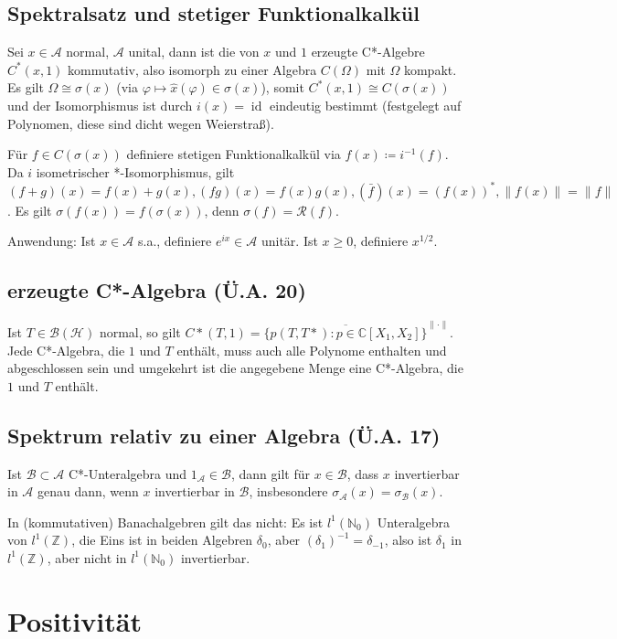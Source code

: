 \documentclass[11pt,a4paper]{scrartcl}
\newcommand{\N}{\mathbb{N}} %
\newcommand{\Z}{\mathbb{Z}} %
\newcommand{\C}{\mathbb{C}} %
\newcommand{\Hc}{\mathcal{H}}
\newcommand{\A}{\mathcal{A}}
\newcommand{\B}{\mathcal{B}}
\newcommand{\Rc}{\mathcal{R}}
\theoremstyle{plain}
\theoremstyle{definition}
\theoremstyle{remark}
\DeclareMathOperator{\id}{id}
\begin{document}
\subsection{Spektralsatz und stetiger Funktionalkalkül}

Sei $x\in \A$ normal, $\A$ unital, dann ist die von $x$ und $1$ erzeugte C*-Algebre $C^*(x,1)$ kommutativ, also isomorph zu einer Algebra $C(\Omega)$ mit $\Omega$ kompakt. Es gilt $\Omega \cong \sigma(x)$ (via $\varphi \mapsto \hat x(\varphi) \in \sigma(x)$), somit $C^*(x,1)\cong C(\sigma(x))$ und der Isomorphismus ist durch $i(x)=\id$ eindeutig bestimmt (festgelegt auf Polynomen, diese sind dicht wegen Weierstraß).

Für $f\in C(\sigma(x))$ definiere stetigen Funktionalkalkül via $f(x) \coloneqq i^{-1}(f)$. Da $i$ isometrischer *-Isomorphismus, gilt $(f+g)(x)=f(x)+g(x), (fg)(x)=f(x)g(x), (\bar f)(x)=(f(x))^*, \|f(x)\|=\|f\|$. Es gilt $\sigma(f(x))=f(\sigma(x))$, denn $\sigma(f)=\Rc(f)$.

Anwendung: Ist $x\in \A$ s.a., definiere $e^{ix}\in \A$ unitär. Ist $x \geq 0$, definiere $x^{1/2}$.

\subsection{erzeugte C*-Algebra (Ü.A. 20)}

Ist $T\in \B(\Hc)$ normal, so gilt $C*(T,1)=\overline{\{p(T,T*): p\in \C[X_1,X_2]\}}^{\|\cdot\|}$. Jede C*-Algebra, die $1$ und $T$ enthält, muss auch alle Polynome enthalten und abgeschlossen sein und umgekehrt ist die angegebene Menge eine C*-Algebra, die $1$ und $T$ enthält.

\subsection{Spektrum relativ zu einer Algebra (Ü.A. 17)}

Ist $\B \subset \A$ C*-Unteralgebra und $1_\mathcal{A} \in \B$, dann gilt für $x\in \B$, dass $x$ invertierbar in $\A$ genau dann, wenn $x$ invertierbar in $\B$, insbesondere $\sigma_\A(x)=\sigma_\B(x)$.

In (kommutativen) Banachalgebren gilt das nicht: Es ist $l^1(\N_0)$ Unteralgebra von $l^1(\Z)$, die Eins ist in beiden Algebren $\delta_0$, aber $(\delta_1)^{-1}=\delta_{-1}$, also ist $\delta_1$ in $l^1(\Z)$, aber nicht in $l^1(\N_0)$ invertierbar.

\section{Positivität}
\end{document}
